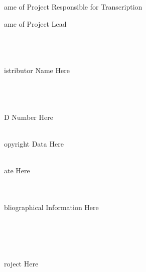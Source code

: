 \documentclass{report}
\begin{document}
\newcommand{\mnote}[1] {\marginpar{\scriptsize \raggedright #1 }}


	\chapter{}

	\marginpar{}

	\par{
 	
	}

	\par{
 	ame of Project Responsible for Transcription\ \\
	}

	\par{
 	ame of Project Lead\ \\\ \\\ \\\ \\
	}

	\par{
 	istributor Name Here\ \\\ \\\ \\\ \\
	}

	\par{
 	D Number Here\ \\\ \\
	}

	\par{
 	opyright Data Here\ \\\ \\
	}

	\par{
 	ate Here\ \\\ \\\ \\
	}

	\par{
 	bliographical Information Here\ \\\ \\\ \\\ \\\ \\
	}

	\par{
 	roject Here\ \\\ \\\ \\\ \\\ \\\ \\
	}
\end{document}
